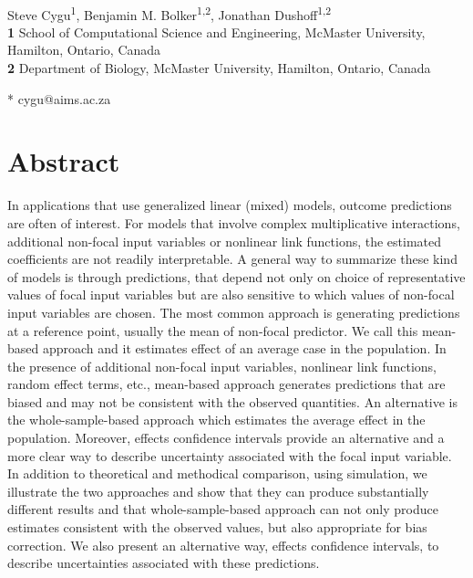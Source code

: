 \begin{flushleft}
{\Large
\textbf{} %
}
\newline
\\
Steve Cygu\textsuperscript{1},
Benjamin M. Bolker\textsuperscript{1,2},
Jonathan Dushoff\textsuperscript{1,2}
\\
\bigskip
\textbf{1} School of Computational Science and Engineering, McMaster University, Hamilton, Ontario, Canada
\\
\textbf{2} Department of Biology, McMaster University, Hamilton, Ontario, Canada
\\
\bigskip


* cygu@aims.ac.za

\end{flushleft}
\section*{Abstract}

In applications that use generalized linear (mixed) models, outcome predictions are often of interest. For models that involve complex multiplicative interactions, additional non-focal input variables or nonlinear link functions, the estimated coefficients are not readily interpretable. A general way to summarize these kind of models is through predictions, that depend not only on choice of representative values of focal input variables but are also sensitive to which values of non-focal input variables are chosen. The most common approach is generating predictions at a reference point, usually the mean of non-focal predictor. We call this mean-based approach and it estimates effect of an average case in the population. In the presence of additional non-focal input variables, nonlinear link functions, random effect terms, etc., mean-based approach generates predictions that are biased and may not be consistent with the observed quantities. An alternative is the whole-sample-based approach which estimates the average effect in the population. Moreover, effects confidence intervals provide an alternative and a more clear way to describe uncertainty associated with the focal input variable. In addition to theoretical and methodical comparison, using simulation, we illustrate the two approaches and show that they can produce substantially different results and that whole-sample-based approach can not only produce estimates consistent with the observed values, but also appropriate for bias correction. We also present an alternative way, effects confidence intervals, to describe uncertainties associated with these predictions.

